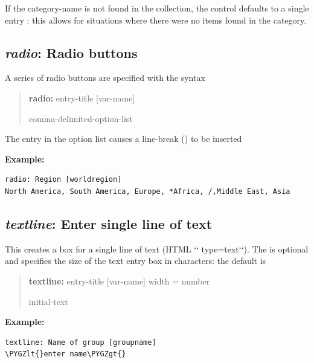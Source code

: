 \documentclass[letterpaper,10pt,english]{sphinxmanual}
\def\PYGZlt{\char`\<}
\def\PYGZgt{\char`\>}
\begin{document}
If the category-name is not found in the collection, the control defaults to a single entry \code{-{-}-}: this allows for
situations where there were no items found in the category.


\subsection{\emph{radio}: Radio buttons}
\label{forms:radio-radio-buttons}
A series of radio buttons are specified with the syntax
\begin{quote}

\begin{DUlineblock}{0em}
\item[] \textbf{radio:} entry-title {[}var-name{]}
\item[] comma-delimited-option-list
\end{DUlineblock}
\end{quote}

The entry \code{/} in the option list causes a line-break () to be
inserted

\textbf{Example:}

\begin{Verbatim}[commandchars=\\\{\}]
radio: Region [worldregion]
North America, South America, Europe, *Africa, /,Middle East, Asia
\end{Verbatim}


\subsection{\emph{textline}: Enter single line of text}
\label{forms:textline-enter-single-line-of-text}
This creates a box for a single line of text (HTML {}`{}` type=text{}`{}`). The
 is optional and specifies the size of the text entry
box in characters: the default is 
\begin{quote}

\begin{DUlineblock}{0em}
\item[] \textbf{textline:} entry-title {[}var-name{]} width = number
\item[] initial-text
\end{DUlineblock}
\end{quote}

\textbf{Example:}

\begin{Verbatim}[commandchars=\\\{\}]
textline: Name of group [groupname]
\PYGZlt{}enter name\PYGZgt{}
\end{Verbatim}
\end{document}
